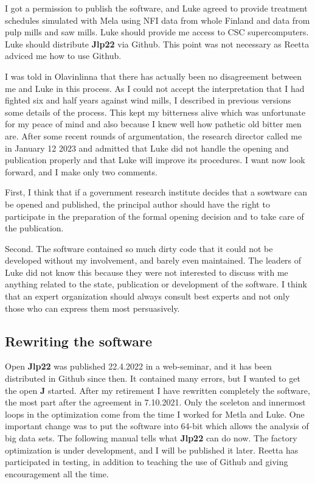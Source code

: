 I got a 
permission to publish the software, and Luke agreed to 
provide  treatment schedules simulated with Mela using NFI data from whole Finland and data 
from pulp mills and saw mills. 
Luke should provide me access to CSC supercomputers.  Luke should distribute \textbf{Jlp22} via Github.  This point 
was not necessary as Reetta adviced me how to use Github. 
 
I was told in Olavinlinna that there has actually been no disagreement 
between me and Luke in this process. 
As I could not accept the interpretation that I had fighted six and half years against wind mills, 
I described in previous versions some details of the process. This kept my bitterness 
alive which was unfortunate for my peace of mind and also because 
I knew well how pathetic old bitter men are. After some recent rounds of argumentation, the research director 
called me in January 12 2023 and admitted that Luke did not handle the opening and publication properly 
and that Luke will improve its procedures. I want now look forward, and I make 
only two comments. 
 
First, I think that if a government research institute decides that a sowtware can be 
opened and published, the principal author should have the right to participate in the 
preparation of the formal opening decision and to take care of the publication. 
 
Second. 
The software contained so much dirty code that it could not be developed without my involvement, 
and barely even maintained. The leaders of Luke did not know this because they were not 
interested to discuss with me anything related to the state, publication or 
development of the software. I think that an expert organization should 
always consult best experts and not only those who can express them most persuasively. 
 
 
\subsection*{Rewriting the software} 
 
Open \textbf{Jlp22} was published 22.4.2022 in a web-seminar, and it has been distributed in Github since then. 
It contained many errors, but I wanted to get the open \textbf{J} started. 
After my retirement I have rewritten completely the software, 
the most part after the agreement in 7.10.2021. 
Only the sceleton and innermost loops in the optimization come from the time I worked 
for Metla and Luke. One important change was to put the software into 64-bit which 
allows the analysis of big data sets. The following manual tells what \textbf{Jlp22} can do now. 
The factory optimization is under development, and I will be published it later. 
Reetta has participated 
in testing, in addition to teaching the use of Github and giving encouragement all the time. 
 
